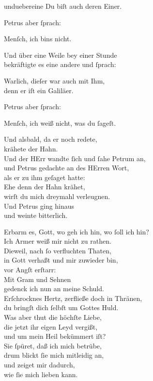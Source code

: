 \documentclass[tocstyle=ref-genre]{ees}
\begin{document}
{\begin{movement}{unduebereine}
  \voice[Magd II]
  Du biſt auch deren Einer.

  \voice[Evangelist]
  Petrus aber ſprach:

  \voice[Petrus]\enlargethispage\baselineskip
  Menſch, ich bins nicht.

  \voice[Evangelist]
  Und über eine Weile bey einer Stunde\\
  bekräftigte es eine andere und ſprach:

  Warlich, dieſer war auch mit Ihm,\\
  denn er iſt ein Galiläer.

  \voice[Evangelist]
  Petrus aber ſprach:

  \voice[Petrus]
  Menſch, ich weiß nicht, was du ſageſt.

  \voice[Evangelist]
  Und alsbald, da er noch redete,\\
  krähete der Hahn.\\
  Und der HErr wandte ſich und ſahe Petrum an,\\
  und Petrus gedachte an des HErren Wort,\\
  als er zu ihm geſaget hatte:\\
  Ehe denn der Hahn krähet,\\
  wirſt du mich dreymahl verleugnen.\\
  Und Petrus ging hinaus\\
  und weinte bitterlich.

  \voice[Petrus]
  Erbarm es, Gott,
  wo geh ich hin, wo ſoll ich hin?\\
  Ich Armer weiß mir nicht zu rathen.\\
  Dieweil, nach ſo verfluchten Thaten,\\
  in Gott verhaßt und mir zuwieder bin,\\
  vor Angſt erſtarr:\\
  Mit Gram und Sehnen\\
  gedenck ich nun an meine Schuld.\\
  Erſchrocknes Hertz, zerfließe doch in Thränen,\\
  du bringſt dich ſelbſt um Gottes Huld.\\
  Was aber thut die höchſte Liebe,\\
  die jetzt ihr eigen Leyd vergißt,\\
  und um mein Heil bekümmert iſt?\\
  Sie ſpüret, daß ich mich betrübe,\\
  drum blickt ſie mich mitleidig an,\\
  und zeiget mir dadurch,\\
  wie ſie mich lieben kann.
\end{movement}

}
\end{document}

